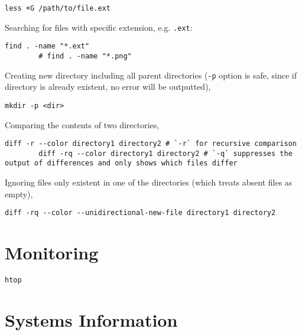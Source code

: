 \documentclass[12pt, a4paper]{scrbook}
\numberwithin{equation}{section}
\theoremstyle{definition}
\theoremstyle{definition}
\begin{document}
	\begin{lstlisting}[style=mystylebash, label=alg:less__bottom_scroll, xleftmargin=\parindent]
		less +G /path/to/file.ext
	\end{lstlisting}

	Searching for files with specific extension, e.g. \texttt{.ext}: 
	
	\begin{lstlisting}[style=mystylebash, label=alg:bash_find, xleftmargin=\parindent]
		find . -name "*.ext"
		# find . -name "*.png"
	\end{lstlisting}
	
	Creating new directory including all parent directories (\texttt{-p} option is safe, since if directory is already existent, 
	no error will be outputted),
	
	\begin{lstlisting}[style=mystylebash, label=alg:bash__dir_creation, xleftmargin=\parindent]
		mkdir -p <dir>
	\end{lstlisting}
	
	Comparing the contents of two directories,
	
	\begin{lstlisting}[style=mystylebash, label=alg:bash_diff__dir, xleftmargin=\parindent]
		diff -r --color directory1 directory2 # `-r` for recursive comparison
		diff -rq --color directory1 directory2 # `-q` suppresses the output of differences and only shows which files differ
	\end{lstlisting}
	
	Ignoring files only existent in one of the directories (which treats absent files as empty),
	
	\begin{lstlisting}[style=mystylebash, label=alg:, xleftmargin=\parindent]
		diff -rq --color --unidirectional-new-file directory1 directory2 
	\end{lstlisting}

	\section{Monitoring}
	
	\begin{lstlisting}[style=mystylebash, label=alg:htop, xleftmargin=\parindent]
		htop
	\end{lstlisting}

	\section{Systems Information}
	
\end{document}
